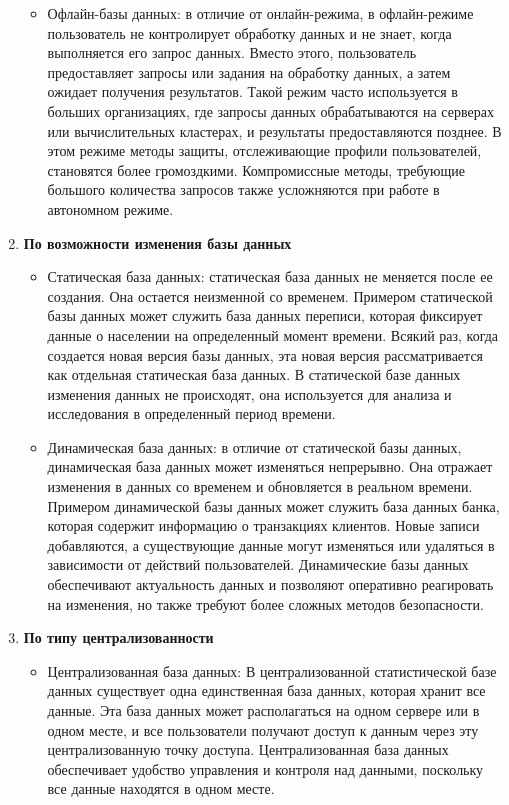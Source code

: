 \begin{enumerate}
\begin{itemize}
        \item Офлайн-базы данных: в отличие от онлайн-режима, в офлайн-режиме пользователь не контролирует обработку данных и не знает, когда выполняется его запрос данных. Вместо этого, пользователь предоставляет запросы или задания на обработку данных, а затем ожидает получения результатов. Такой режим часто используется в больших организациях, где запросы данных обрабатываются на серверах или вычислительных кластерах, и результаты предоставляются позднее. В этом режиме методы защиты, отслеживающие профили пользователей, становятся более громоздкими. Компромиссные методы, требующие большого количества запросов также усложняются при работе в автономном режиме.
    \end{itemize}
    \item \textbf{По возможности изменения базы данных} \begin{itemize}
        \item Статическая база данных: статическая база данных не меняется после ее создания. Она остается неизменной со временем. Примером статической базы данных может служить база данных переписи, которая фиксирует данные о населении на определенный момент времени. Всякий раз, когда создается новая версия базы данных, эта новая версия рассматривается как отдельная статическая база данных. В статической базе данных изменения данных не происходят, она используется для анализа и исследования в определенный период времени.

        \item Динамическая база данных: в отличие от статической базы данных, динамическая база данных может изменяться непрерывно. Она отражает изменения в данных со временем и обновляется в реальном времени. Примером динамической базы данных может служить база данных банка, которая содержит информацию о транзакциях клиентов. Новые записи добавляются, а существующие данные могут изменяться или удаляться в зависимости от действий пользователей. Динамические базы данных обеспечивают актуальность данных и позволяют оперативно реагировать на изменения, но также требуют более сложных методов безопасности. 
    \end{itemize}
    \item \textbf{По типу централизованности} \begin{itemize}
        \item Централизованная база данных: В централизованной статистической базе данных существует одна единственная база данных, которая хранит все данные. Эта база данных может располагаться на одном сервере или в одном месте, и все пользователи получают доступ к данным через эту централизованную точку доступа. Централизованная база данных обеспечивает удобство управления и контроля над данными, поскольку все данные находятся в одном месте.


\end{itemize}
\end{enumerate}

